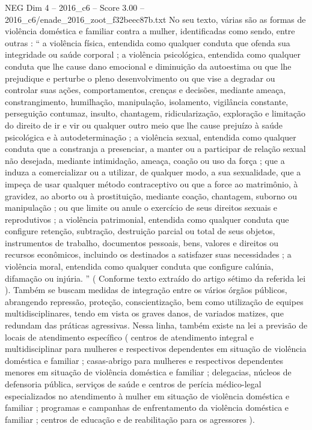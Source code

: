 \begin{textsample}{NEG Dim 4 – 2016\_c6 – Score 3.00 – 2016\_c6/enade\_2016\_zoot\_f32beec87b.txt}
No seu texto, várias são as formas de violência doméstica e familiar contra a mulher, identificadas como sendo, entre outras : “ a violência física, entendida como qualquer conduta que ofenda sua integridade ou saúde corporal ; a violência psicológica, entendida como qualquer conduta que lhe cause dano emocional e diminuição da autoestima ou que lhe prejudique e perturbe o pleno desenvolvimento ou que vise a degradar ou controlar suas ações, comportamentos, crenças e decisões, mediante ameaça, constrangimento, humilhação, manipulação, isolamento, vigilância constante, perseguição contumaz, insulto, chantagem, ridicularização, exploração e limitação do direito de ir e vir ou qualquer outro meio que lhe cause prejuízo à saúde psicológica e à autodeterminação ; a violência sexual, entendida como qualquer conduta que a constranja a presenciar, a manter ou a participar de relação sexual não desejada, mediante intimidação, ameaça, coação ou uso da força ; que a induza a comercializar ou a utilizar, de qualquer modo, a sua sexualidade, que a impeça de usar qualquer método contraceptivo ou que a force ao matrimônio, à gravidez, ao aborto ou à prostituição, mediante coação, chantagem, suborno ou manipulação ; ou que limite ou anule o exercício de seus direitos sexuais e reprodutivos ; a violência patrimonial, entendida como qualquer conduta que configure retenção, subtração, destruição parcial ou total de seus objetos, instrumentos de trabalho, documentos pessoais, bens, valores e direitos ou recursos econômicos, incluindo os destinados a satisfazer suas necessidades ; a violência moral, entendida como qualquer conduta que configure calúnia, difamação ou injúria. ” ( Conforme texto extraído do artigo sétimo da referida lei ).
Também se buscam medidas de integração entre os vários órgãos públicos, abrangendo repressão, proteção, conscientização, bem como utilização de equipes multidisciplinares, tendo em vista os graves danos, de variados matizes, que redundam das práticas agressivas.
Nessa linha, também existe na lei a previsão de locais de atendimento específico ( centros de atendimento integral e multidisciplinar para mulheres e respectivos dependentes em situação de violência doméstica e familiar ; casas-abrigo para mulheres e respectivos dependentes menores em situação de violência doméstica e familiar ; delegacias, núcleos de defensoria pública, serviços de saúde e centros de perícia médico-legal especializados no atendimento à mulher em situação de violência doméstica e familiar ; programas e campanhas de enfrentamento da violência doméstica e familiar ; centros de educação e de reabilitação para os agressores ).

\end{textsample}
